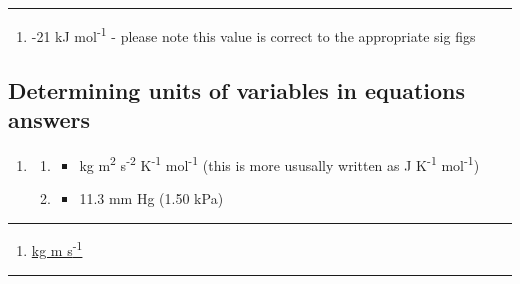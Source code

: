 \documentclass[
]{book}
\providecommand{\tightlist}{%
  \setlength{\itemsep}{0pt}\setlength{\parskip}{0pt}}
\begin{document}
\begin{center}\rule{0.5\linewidth}{0.5pt}\end{center}

\begin{enumerate}
\def\labelenumi{\arabic{enumi}.}
\setcounter{enumi}{2}
\tightlist
\item
  -21 kJ mol\textsuperscript{-1} - please note this value is correct to the appropriate sig figs
\end{enumerate}

\hypertarget{subsec:detunitsans}{%
\subsection{Determining units of variables in equations answers}\label{subsec:detunitsans}}

\begin{enumerate}
\def\labelenumi{\arabic{enumi}.}
\item
  \begin{enumerate}
  \def\labelenumii{\alph{enumii}.}
  \item
    \begin{itemize}
    \tightlist
    \item
      kg m\textsuperscript{2} s\textsuperscript{-2} K\textsuperscript{-1} mol\textsuperscript{-1} (this is more ususally written as J K\textsuperscript{-1} mol\textsuperscript{-1})
    \end{itemize}
  \item
    \begin{itemize}
    \tightlist
    \item
      11.3 mm Hg (1.50 kPa)
    \end{itemize}
  \end{enumerate}
\end{enumerate}

\begin{center}\rule{0.5\linewidth}{0.5pt}\end{center}

\begin{enumerate}
\def\labelenumi{\arabic{enumi}.}
\setcounter{enumi}{1}
\tightlist
\item
  \href{https://www.youtube.com/embed/3cuSZZF3Z4Y}{kg m s\textsuperscript{-1}}
\end{enumerate}

\begin{center}\rule{0.5\linewidth}{0.5pt}\end{center}
\end{document}
